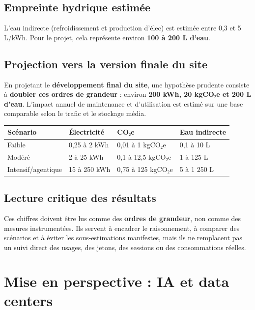 \documentclass[
  10pt,
  a4paper,
  DIV=11,
  numbers=noendperiod,
  oneside]{scrreprt}
\newcounter{none} %
\let\oldtextbf\textbf
\renewcommand{\textbf}[1]{\oldtextbf{\textcolor{cmmnavy}{#1}}}
\begin{document}
\subsection{Empreinte hydrique
estimée}\label{empreinte-hydrique-estimuxe9e}

L'eau indirecte (refroidissement et production d'élec) est estimée entre
0,3 et 5 L/kWh. Pour le projet, cela représente environ \textbf{100 à
200 L d'eau}.

\subsection{Projection vers la version finale du
site}\label{projection-vers-la-version-finale-du-site}

En projetant le \textbf{développement final du site}, une hypothèse
prudente consiste à \textbf{doubler ces ordres de grandeur} : environ
\textbf{200 kWh, 20 kgCO₂e et 200 L d'eau}. L'impact annuel de
maintenance et d'utilisation est estimé sur une base comparable selon le
trafic et le stockage média.

{\def\LTcaptype{none} %
\begin{longtable}[]{@{}llll@{}}
\toprule\noalign{}
Scénario & Électricité & CO₂e & Eau indirecte \\
\midrule\noalign{}
\endhead
\bottomrule\noalign{}
\endlastfoot
Faible & 0,25 à 2 kWh & 0,01 à 1 kgCO₂e & 0,1 à 10 L \\
Modéré & 2 à 25 kWh & 0,1 à 12,5 kgCO₂e & 1 à 125 L \\
Intensif/agentique & 15 à 250 kWh & 0,75 à 125 kgCO₂e & 5 à 1 250 L \\
\end{longtable}
}

\subsection{Lecture critique des
résultats}\label{lecture-critique-des-ruxe9sultats}

Ces chiffres doivent être lus comme des \textbf{ordres de grandeur}, non
comme des mesures instrumentées. Ils servent à encadrer le raisonnement,
à comparer des scénarios et à éviter les sous-estimations manifestes,
mais ils ne remplacent pas un suivi direct des usages, des jetons, des
sessions ou des consommations réelles.

\section{Mise en perspective : IA et data
centers}\label{mise-en-perspective-ia-et-data-centers}
\end{document}
